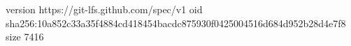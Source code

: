 version https://git-lfs.github.com/spec/v1
oid sha256:10a852c33a35f4884cd418454bacdc875930f0425004516d684d952b28d4e7f8
size 7416

